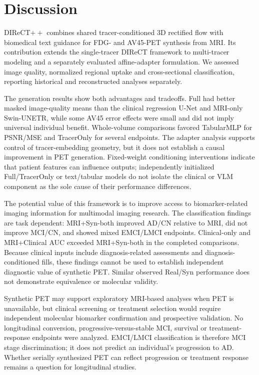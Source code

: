 \section{Discussion}
DIReCT$++$ combines shared tracer-conditioned 3D rectified flow with biomedical text guidance for FDG- and AV45-PET synthesis from MRI. Its contribution extends the single-tracer DIReCT framework to multi-tracer modeling and a separately evaluated affine-adapter formulation. We assessed image quality, normalized regional uptake and cross-sectional classification, reporting historical and reconstructed analyses separately.

The generation results show both advantages and tradeoffs. Full had better masked image-quality means than the clinical regression U-Net and MRI-only Swin-UNETR, while some AV45 error effects were small and did not imply universal individual benefit. Whole-volume comparisons favored TabularMLP for PSNR/MSE and TracerOnly for several endpoints. The adapter analysis supports control of tracer-embedding geometry, but it does not establish a causal improvement in PET generation. Fixed-weight conditioning interventions indicate that patient features can influence outputs; independently initialized Full/TracerOnly or text/tabular models do not isolate the clinical or VLM component as the sole cause of their performance differences.

The potential value of this framework is to improve access to biomarker-related imaging information for multimodal imaging research. The classification findings are task dependent: MRI+Syn-both improved AD/CN relative to MRI, did not improve MCI/CN, and showed mixed EMCI/LMCI endpoints. Clinical-only and MRI+Clinical AUC exceeded MRI+Syn-both in the completed comparisons. Because clinical inputs include diagnosis-related assessments and diagnosis-conditioned fills, these findings cannot be used to establish independent diagnostic value of synthetic PET. Similar observed Real/Syn performance does not demonstrate equivalence or molecular validity.

Synthetic PET may support exploratory MRI-based analyses when PET is unavailable, but clinical screening or treatment selection would require independent molecular biomarker confirmation and prospective validation. No longitudinal conversion, progressive-versus-stable MCI, survival or treatment-response endpoints were analyzed. EMCI/LMCI classification is therefore MCI stage discrimination; it does not predict an individual's progression to AD. Whether serially synthesized PET can reflect progression or treatment response remains a question for longitudinal studies.

